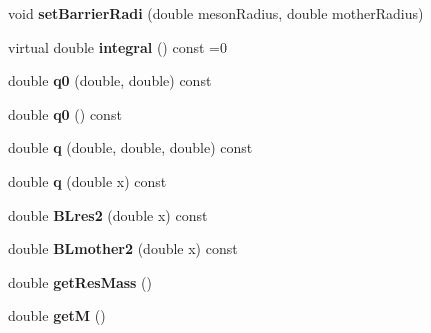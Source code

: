\begin{DoxyCompactItemize}
\item 
\hypertarget{class_amp_kinematics_af2f3b8acc45052cb542e3c5b7113b53f}{void {\bfseries set\-Barrier\-Radi} (double meson\-Radius, double mother\-Radius)}\label{class_amp_kinematics_af2f3b8acc45052cb542e3c5b7113b53f}

\item 
\hypertarget{class_amp_kinematics_a2bcea6d497808708d8b4ebd45b300d29}{virtual double {\bfseries integral} () const =0}\label{class_amp_kinematics_a2bcea6d497808708d8b4ebd45b300d29}

\item 
\hypertarget{class_amp_kinematics_a8be1e6f1a1882aaf8c0a5b071fae0037}{double {\bfseries q0} (double, double) const }\label{class_amp_kinematics_a8be1e6f1a1882aaf8c0a5b071fae0037}

\item 
\hypertarget{class_amp_kinematics_a01232d768abb7a1d11a1c5f34f3de337}{double {\bfseries q0} () const }\label{class_amp_kinematics_a01232d768abb7a1d11a1c5f34f3de337}

\item 
\hypertarget{class_amp_kinematics_a35d46b91f21c11e993ca7322845b1ac0}{double {\bfseries q} (double, double, double) const }\label{class_amp_kinematics_a35d46b91f21c11e993ca7322845b1ac0}

\item 
\hypertarget{class_amp_kinematics_a5ea5cfbe70dd50fffbd151a061eb8b8a}{double {\bfseries q} (double x) const }\label{class_amp_kinematics_a5ea5cfbe70dd50fffbd151a061eb8b8a}

\item 
\hypertarget{class_amp_kinematics_a8032a5eef359956ee8ac515066eb9df0}{double {\bfseries B\-Lres2} (double x) const }\label{class_amp_kinematics_a8032a5eef359956ee8ac515066eb9df0}

\item 
\hypertarget{class_amp_kinematics_a19ccd90e265f0a413705ca8788173f7b}{double {\bfseries B\-Lmother2} (double x) const }\label{class_amp_kinematics_a19ccd90e265f0a413705ca8788173f7b}

\item 
\hypertarget{class_amp_kinematics_aeeaa97d504bc79598854a15e6566513a}{double {\bfseries get\-Res\-Mass} ()}\label{class_amp_kinematics_aeeaa97d504bc79598854a15e6566513a}

\item 
\hypertarget{class_amp_kinematics_a0a2da046c355c7f6ac473b0bdb7fa0aa}{double {\bfseries get\-M} ()}\label{class_amp_kinematics_a0a2da046c355c7f6ac473b0bdb7fa0aa}


\end{DoxyCompactItemize}
